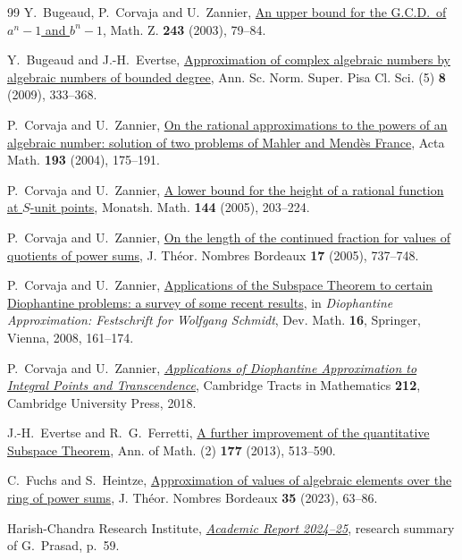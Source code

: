 \documentclass[11pt,a4paper,reqno]{amsart}
\theoremstyle{definition}
\theoremstyle{remark}
\numberwithin{equation}{section}
\begin{document}
\begin{thebibliography}{99}
 Y.~Bugeaud, P.~Corvaja and U.~Zannier, \href{https://doi.org/10.1007/s00209-002-0449-z}{An upper bound for the G.C.D.\ of \(a^n-1\) and \(b^n-1\)}, Math. Z. \textbf{243} (2003), 79--84.

 Y.~Bugeaud and J.-H.~Evertse, \href{https://www.numdam.org/item/ASNSP_2009_5_8_2_333_0/}{Approximation of complex algebraic numbers by algebraic numbers of bounded degree}, Ann. Sc. Norm. Super. Pisa Cl. Sci. (5) \textbf{8} (2009), 333--368.

 P.~Corvaja and U.~Zannier, \href{https://doi.org/10.1007/BF02392563}{On the rational approximations to the powers of an algebraic number: solution of two problems of Mahler and Mend\`es France}, Acta Math. \textbf{193} (2004), 175--191.

 P.~Corvaja and U.~Zannier, \href{https://arxiv.org/abs/math/0311030}{A lower bound for the height of a rational function at \(S\)-unit points}, Monatsh. Math. \textbf{144} (2005), 203--224.

 P.~Corvaja and U.~Zannier, \href{https://doi.org/10.5802/jtnb.517}{On the length of the continued fraction for values of quotients of power sums}, J. Th\'eor. Nombres Bordeaux \textbf{17} (2005), 737--748.

 P.~Corvaja and U.~Zannier, \href{https://doi.org/10.1007/978-3-211-74280-8_8}{Applications of the Subspace Theorem to certain Diophantine problems: a survey of some recent results}, in \emph{Diophantine Approximation: Festschrift for Wolfgang Schmidt}, Dev. Math. \textbf{16}, Springer, Vienna, 2008, 161--174.

 P.~Corvaja and U.~Zannier, \href{https://doi.org/10.1017/9781108348096}{\emph{Applications of Diophantine Approximation to Integral Points and Transcendence}}, Cambridge Tracts in Mathematics \textbf{212}, Cambridge University Press, 2018.

 J.-H.~Evertse and R.~G.~Ferretti, \href{https://annals.math.princeton.edu/2013/177-2/p04}{A further improvement of the quantitative Subspace Theorem}, Ann. of Math. (2) \textbf{177} (2013), 513--590.

 C.~Fuchs and S.~Heintze, \href{https://doi.org/10.5802/jtnb.1247}{Approximation of values of algebraic elements over the ring of power sums}, J. Th\'eor. Nombres Bordeaux \textbf{35} (2023), 63--86.

 Harish-Chandra Research Institute, \href{https://www.hri.res.in/~anlweb/Academic-Report-2024-25.pdf}{\emph{Academic Report 2024--25}}, research summary of G.~Prasad, p.~59.


\end{thebibliography}
\end{document}
